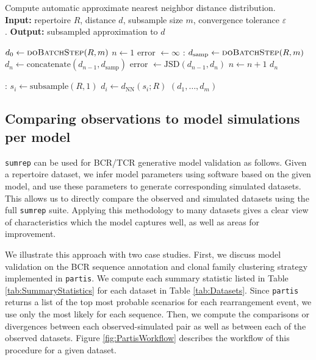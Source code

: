 \documentclass{article}
\begin{document}
\begin{algorithm}
    \caption{Compute automatic approximate nearest neighbor distance distribution.\\
        \textbf{Input:} repertoire $R$, distance $d$, subsample size $m$, convergence tolerance $\varepsilon$\\.
        \textbf{Output:} subsampled approximation to $d$}
    \label{NNDistributionAveraging}
    \begin{algorithmic}
        \State $d_0 \gets \Call{doBatchStep}{R, m}$
        \State $n \gets 1$
        \State error $\gets \infty$
        :
        	\State $d_\text{samp} \gets \Call{doBatchStep}{R, m}$
        	\State $d_n \gets \text{concatenate}(d_{n-1}, d_\text{samp})$
        	\State error $\gets \text{JSD}(d_{n-1}, d_n)$
        	\State $n \gets n + 1$
        \EndWhile
            \Return $d_n$
    \end{algorithmic}
    \begin{algorithmic}
    :
		\State $s_i \gets \text{subsample}(R, 1)$
        \State $d_i \gets d_\text{NN}(s_i; R)$
	\EndFor
	\Return $(d_1, \dotsc, d_m)$
	\EndFunction
    \end{algorithmic}
\end{algorithm}



\subsection*{Comparing observations to model simulations per model}
\texttt{sumrep} can be used for BCR/TCR generative model validation as follows.
Given a repertoire dataset, we infer model parameters using software based on the given model, and use these parameters to generate corresponding simulated datasets.
This allows us to directly compare the observed and simulated datasets using the full \texttt{sumrep} suite.
Applying this methodology to many datasets gives a clear view of characteristics which the model captures well, as well as areas for improvement.

We illustrate this approach with two case studies.
First, we discuss model validation on the BCR sequence annotation and clonal family clustering strategy implemented in \texttt{partis}\cite{Ralph2016-nw, Ralph2016-iz}.
We compute each summary statistic listed in Table \ref{tab:SummaryStatistics} for each dataset in Table \ref{tab:Datasets}.
Since \texttt{partis} returns a list of the top most probable scenarios for each rearrangement event, we use only the most likely for each sequence.
Then, we compute the comparisons or divergences between each observed-simulated pair as well as between each of the observed datasets.
Figure \ref{fig:PartisWorkflow} describes the workflow of this procedure for a given dataset.
\end{document}
